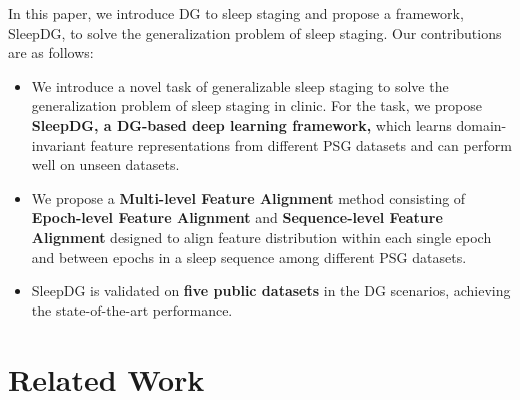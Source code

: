 \documentclass[letterpaper]{article} %
\begin{document}
	In this paper, we introduce DG to sleep staging and propose a framework, SleepDG, to solve the generalization problem of sleep staging.
	Our contributions are as follows:
	\begin{itemize}
		\item
		We introduce a novel task of generalizable sleep staging to solve the generalization problem of sleep staging in clinic. For the task, we propose \textbf{SleepDG, a DG-based deep learning framework,} which learns domain-invariant feature representations from different  PSG datasets and can perform well on unseen datasets.

		\item
		We propose a \textbf{Multi-level Feature Alignment} method consisting of \textbf{Epoch-level Feature Alignment} and \textbf{Sequence-level Feature Alignment} designed to align feature distribution within each single epoch and between epochs in a sleep sequence among different PSG datasets.

		\item
		SleepDG is validated on \textbf{five public datasets} in the DG scenarios, achieving the state-of-the-art performance.
	\end{itemize}


	\section{Related Work}
\end{document}
